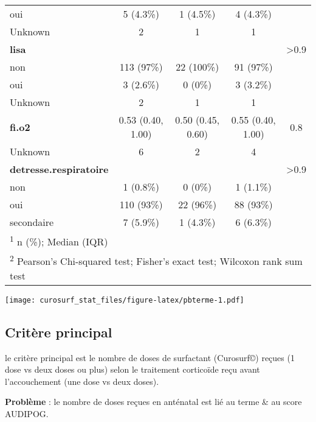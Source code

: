 \documentclass[
  10pt,
  a4paper,
]{scrartcl}
\begin{document}
\begin{longtable}[t]{lcccc}
\hspace{1em}oui & 5 (4.3\%) & 1 (4.5\%) & 4 (4.3\%) & \\
\hspace{1em}Unknown & 2 & 1 & 1 \vphantom{1} & \\
\textbf{lisa} &  &  &  & >0.9\\
\addlinespace
\hspace{1em}non & 113 (97\%) & 22 (100\%) & 91 (97\%) & \\
\hspace{1em}oui & 3 (2.6\%) & 0 (0\%) & 3 (3.2\%) & \\
\hspace{1em}Unknown & 2 & 1 & 1 & \\
\textbf{fi.o2} & 0.53 (0.40, 1.00) & 0.50 (0.45, 0.60) & 0.55 (0.40, 1.00) & 0.8\\
\hspace{1em}Unknown & 6 & 2 & 4 & \\
\addlinespace
\textbf{detresse.respiratoire} &  &  &  & >0.9\\
\hspace{1em}non & 1 (0.8\%) & 0 (0\%) & 1 (1.1\%) & \\
\hspace{1em}oui & 110 (93\%) & 22 (96\%) & 88 (93\%) & \\
\hspace{1em}secondaire & 7 (5.9\%) & 1 (4.3\%) & 6 (6.3\%) & \\*
\multicolumn{5}{l}{\rule{0pt}{1em}\textsuperscript{1} n (\%); Median (IQR)}\\
\multicolumn{5}{l}{\rule{0pt}{1em}\textsuperscript{2} Pearson's Chi-squared test; Fisher's exact test; Wilcoxon rank sum test}\\
\end{longtable}

\texttt{[image: curosurf\_stat\_files/figure-latex/pbterme-1.pdf]}

\hypertarget{crituxe8re-principal}{%
\subsection{Critère principal}\label{crituxe8re-principal}}

le critère principal est le nombre de doses de surfactant (Curosurf©)
reçues (1 dose vs deux doses ou plus) selon le traitement corticoïde
reçu avant l'accouchement (une dose vs deux doses).

\textbf{Problème} : le nombre de doses reçues en anténatal est lié au
terme \& au score AUDIPOG.
\end{document}
